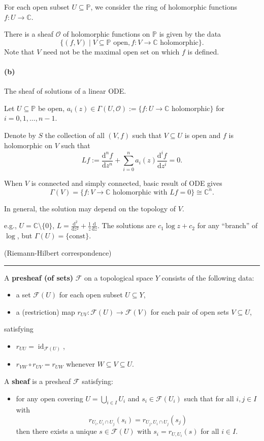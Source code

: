 \documentclass[12pt]{article}
\newcommand{\keyword}[1]{\textbf{#1}}
\newcommand{\sepline}{\rule{\textwidth}{0.4pt}}
\theoremstyle{definition}
\newcommand{\C}{\mathbb{C}}
\renewcommand{\P}{\mathbb{P}}
\newcommand{\OO}{\mathcal{O}}
\newcommand{\FF}{\mathcal{F}}
\newcommand{\<}{\left\langle}
\renewcommand{\>}{\right\rangle}
\newcommand{\iso}{\cong}
\newcommand{\seq}{\subseteq}
\DeclareMathOperator{\id}{id}
\newcommand{\dd}{\mathrm{d}}
\renewcommand{\_}[1]{{_{#1}}}
\begin{document}
For each open subset $U \seq \P$, we consider the ring of holomorphic functions $f : U \to \C$.

There is a sheaf $\OO$ of holomorphic functions on $\P$ is given by the data
\[
    \{(f, V) \mid V \seq \P \text{ open}, f : V \to \C \text{ holomorphic}\}.
\]
Note that $V$ need not be the maximal open set on which $f$ is defined.

\paragraph{(b)} The sheaf of solutions of a linear ODE.

Let $U \seq \P$ be open, $a_i(z) \in \Gamma(U, \OO) := \{f : U \to \C \text{ holomorphic}\}$ for $i = 0, 1, \dots, n - 1$.

Denote by $S$ the collection of all $(V, f)$ such that $V \seq U$ is open and $f$ is holomorphic on $V$ such that
\[
    Lf := \frac{\dd^nf}{\dd z^n} + \sum_{i=0}^{n} a_i(z)\frac{\dd^if}{\dd  z^i} = 0.
\]

When $V$ is connected and simply connected, basic result of ODE gives
\[
    \Gamma(V) = \{f : V \to \C \text{ holomorphic with } Lf = 0\} \iso \C^n.
\]

In general, the solution may depend on the topology of $V$.

e.g., $U = \C \setminus \{0\}$, $L = \frac{\dd^2}{\dd{z}^2} + \frac{1}{z}\frac{\dd}{\dd{z}}$.
The solutions are $c_1\log{z} + c_2$ for any ``branch'' of $\log$, but $\Gamma(U) = \{\text{const}\}$.

(Riemann-Hilbert correspondence)

\sepline

A \keyword{presheaf (of sets)} $\FF$ on a topological space $Y$ consists of the following data:
\begin{itemize}
    \item a set $\FF(U)$ for each open subset $U \seq Y$,
    \item a (restriction) map $r_{UV} : \FF(U) \to \FF(V)$ for each pair of open sets $V \seq U$,
\end{itemize}
satisfying
\begin{itemize}
    \item $r_{UU} = \id_{\FF(U)}$,
    \item $r_{VW} \circ r_{UV} = r_{UW}$ whenever $W \seq V \seq U$.
\end{itemize}

A \keyword{sheaf} is a presheaf $\FF$ satisfying:
\begin{itemize}
    \item for any open covering $U = \bigcup_{i \in I} U_i$ and $s_i \in \FF(U_i)$ such that for all $i, j \in I$ with
    \[
        r_{U_i, U_i \cap U_j}(s_i) = r_{U_j, U_i \cap U_j}(s_j)
    \]
    then there exists a unique $s \in \FF(U)$ with $s_i = r_{U,U_i}(s)$ for all $i \in I$.
\end{itemize}
\end{document}
